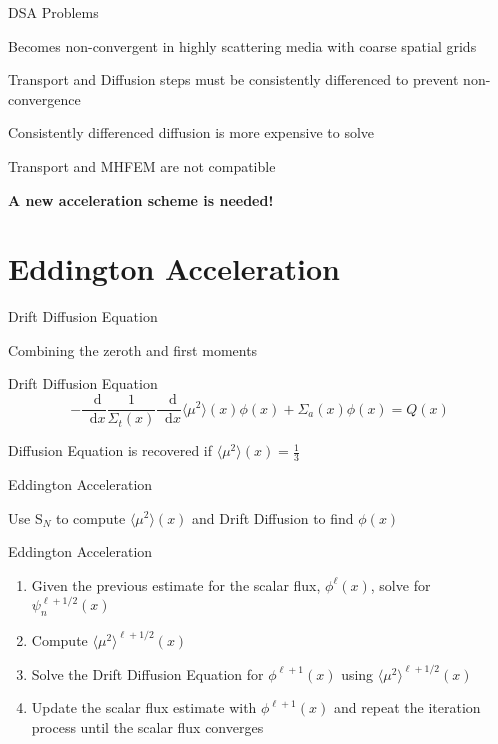 \documentclass[10pt]{beamer}
\newcommand{\SN}{S$_N$\xspace}
\newcommand{\ud}{\mathop{}\!\mathrm{d}} %
\newcommand{\dderiv}[2]{\frac{\ud #1}{\ud #2}}
\newcommand{\edd}{\langle \mu^2 \rangle}
\begin{document}
\begin{frame}{DSA Problems}

    Becomes non-convergent in highly scattering media with coarse spatial grids 

    Transport and Diffusion steps must be consistently differenced to prevent non-convergence 

    Consistently differenced diffusion is more expensive to solve 

    Transport and MHFEM are not compatible

    \vfill 
    \centerline{\textbf{A new acceleration scheme is needed!}}

\end{frame}

\section{Eddington Acceleration}





\begin{frame}{Drift Diffusion Equation}

	Combining the zeroth and first moments 

    \begin{alertblock}{Drift Diffusion Equation}
	\begin{equation*}
		-\dderiv{}{x} \frac{1}{\Sigma_t(x)} \dderiv{}{x} \edd(x) \phi(x) + \Sigma_a(x) \phi(x) = Q(x) 
	\end{equation*}
    \end{alertblock}

	Diffusion Equation is recovered if $\edd(x) = \frac{1}{3}$
	
\end{frame}

\begin{frame}{Eddington Acceleration}

    Use \SN to compute $\edd(x)$ and Drift Diffusion to find $\phi(x)$ 

    \begin{exampleblock}{Eddington Acceleration}
    \begin{enumerate}
        \item Given the previous estimate for the scalar flux, $\phi^{\ell}(x)$, solve for $\psi_n^{\ell+1/2}(x)$

        \item \alert{Compute $\edd^{\ell+1/2}(x)$ }

        \item \alert{Solve the Drift Diffusion Equation for $\phi^{\ell+1}(x)$ using $\edd^{\ell+1/2}(x)$} 

        \item Update the scalar flux estimate with $\phi^{\ell+1}(x)$ and repeat the iteration process until the scalar flux converges
    \end{enumerate}
    \end{exampleblock}

\end{frame}
\end{document}
